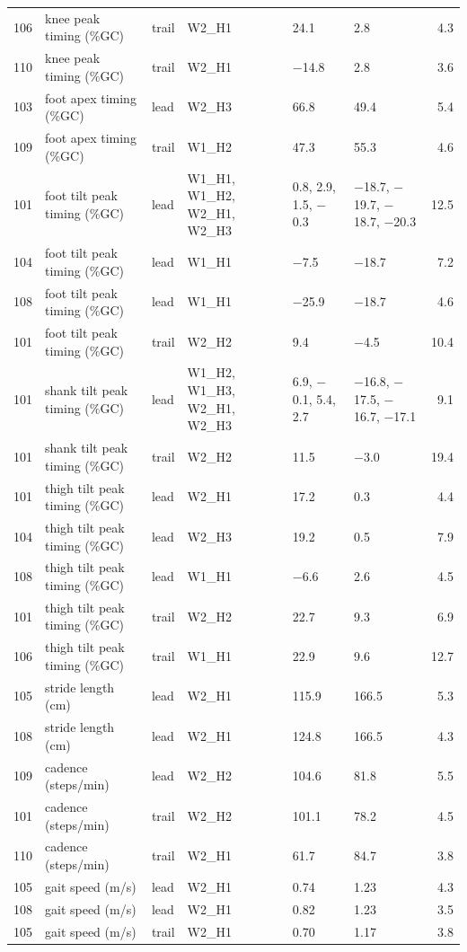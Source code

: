 \begin{longtable}{@{}r p{3.3cm} l p{2.9cm} p{3.0cm} p{3.0cm} r@{}}
106 & knee peak timing (\%GC) & trail & W2\_H1 & 24.1 & 2.8 & 4.3 \\
110 & knee peak timing (\%GC) & trail & W2\_H1 & $-$14.8 & 2.8 & 3.6 \\
103 & foot apex timing (\%GC) & lead & W2\_H3 & 66.8 & 49.4 & 5.4 \\
109 & foot apex timing (\%GC) & trail & W1\_H2 & 47.3 & 55.3 & 4.6 \\
101 & foot tilt peak timing (\%GC) & lead & W1\_H1, W1\_H2, W2\_H1, W2\_H3 & 0.8, 2.9, 1.5, $-$0.3 & $-$18.7, $-$19.7, $-$18.7, $-$20.3 & 12.5 \\
104 & foot tilt peak timing (\%GC) & lead & W1\_H1 & $-$7.5 & $-$18.7 & 7.2 \\
108 & foot tilt peak timing (\%GC) & lead & W1\_H1 & $-$25.9 & $-$18.7 & 4.6 \\
101 & foot tilt peak timing (\%GC) & trail & W2\_H2 & 9.4 & $-$4.5 & 10.4 \\
101 & shank tilt peak timing (\%GC) & lead & W1\_H2, W1\_H3, W2\_H1, W2\_H3 & 6.9, $-$0.1, 5.4, 2.7 & $-$16.8, $-$17.5, $-$16.7, $-$17.1 & 9.1 \\
101 & shank tilt peak timing (\%GC) & trail & W2\_H2 & 11.5 & $-$3.0 & 19.4 \\
101 & thigh tilt peak timing (\%GC) & lead & W2\_H1 & 17.2 & 0.3 & 4.4 \\
104 & thigh tilt peak timing (\%GC) & lead & W2\_H3 & 19.2 & 0.5 & 7.9 \\
108 & thigh tilt peak timing (\%GC) & lead & W1\_H1 & $-$6.6 & 2.6 & 4.5 \\
101 & thigh tilt peak timing (\%GC) & trail & W2\_H2 & 22.7 & 9.3 & 6.9 \\
106 & thigh tilt peak timing (\%GC) & trail & W1\_H1 & 22.9 & 9.6 & 12.7 \\
105 & stride length (cm) & lead & W2\_H1 & 115.9 & 166.5 & 5.3 \\
108 & stride length (cm) & lead & W2\_H1 & 124.8 & 166.5 & 4.3 \\
109 & cadence (steps/min) & lead & W2\_H2 & 104.6 & 81.8 & 5.5 \\
101 & cadence (steps/min) & trail & W2\_H2 & 101.1 & 78.2 & 4.5 \\
110 & cadence (steps/min) & trail & W2\_H1 & 61.7 & 84.7 & 3.8 \\
105 & gait speed (m/s) & lead & W2\_H1 & 0.74 & 1.23 & 4.3 \\
108 & gait speed (m/s) & lead & W2\_H1 & 0.82 & 1.23 & 3.5 \\
105 & gait speed (m/s) & trail & W2\_H1 & 0.70 & 1.17 & 3.8 \\
\end{longtable}
\endgroup
